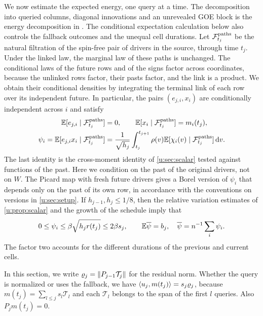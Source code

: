 We now estimate the expected energy, one query at a time.
The decomposition into queried columns, diagonal innovations and an
unrevealed GOE block is the energy decomposition in
\cite[Section~4, proof of Proposition~5]{oai-typical-upper}. The
conditional expectation calculation below also controls the fallback
outcomes and the unequal cell durations.
Let $\mathcal F_{t_j}^{\rm paths}$ be the natural filtration of the
spin-free pair of drivers in the source, through time $t_j$.
Under the linked law, the marginal law of these paths is unchanged. The
conditional laws of the future rows and of the signs factor across
coordinates, because the unlinked rows factor, their pasts factor, and
the link is a product. We obtain their conditional densities by
integrating the terminal link of each row over its independent future.
In particular, the pairs $(e_{j,i},x_i)$
are conditionally independent across $i$ and satisfy
\begin{equation}\label{u:eq:fine-conditional-correlation}
 \begin{aligned}
 \mathbb E[e_{j,i}\mid\mathcal F_{t_j}^{\rm paths}]&=0,\qquad
 \mathbb E[x_i\mid\mathcal F_{t_j}^{\rm paths}]=m_i(t_j),\\
 \psi_i=\mathbb E[e_{j,i}x_i\mid\mathcal F_{t_j}^{\rm paths}]
   &=\frac1{\sqrt{h_j}}\int_{t_j}^{t_{j+1}}\rho(v)
            \mathbb E[\chi_i(v)\mid\mathcal F_{t_j}^{\rm paths}]\,\mathrm d v.
 \end{aligned}
\end{equation}
The last identity is the cross-moment identity of \cref{u:sec:scalar}
tested against functions of the past. Here we condition on the past of
the original drivers, not on $W$. The Picard map with fresh future
drivers gives a Borel version of $\psi_i$ that depends only on the past of
its own row, in accordance with the conventions on versions in \cref{u:sec:setup}.
If $h_{j-1},h_j\le1/8$, then the relative variation
estimates of \cref{u:prop:scalar} and the growth of the schedule imply that
\begin{equation}\label{u:eq:fine-correlation-bound}
 0\le\psi_i\le\beta\sqrt{h_jr(t_j)}\le2\beta s_j,
 \qquad \mathbb E\overline\psi=b_j,\quad
 \overline\psi=n^{-1}\sum_i\psi_i.
\end{equation}
The factor two accounts for the different durations of the previous
and current cells.

In this section, we write $\varrho_j=\lVert P_{j-1}\mathcal T_j\rVert$ for the
residual norm. Whether the query is normalized or uses the fallback, we have
$\langle u_j,m(t_j)\rangle=s_j\varrho_j$, because
$m(t_j)=\sum_{l\le j}s_l\mathcal T_l$ and each $\mathcal T_l$ belongs to the span
of the first $l$ queries. Also $P_jm(t_j)=0$.

